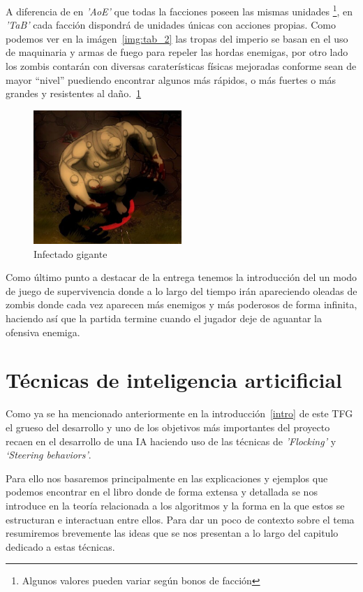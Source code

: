 A diferencia de en \textit{'\ac{AoE}'} que todas la facciones poseen las mismas unidades
\footnote{Algunos valores pueden variar según bonos de facción}, en
\textit{'\ac{TaB}'} cada facción dispondrá de unidades únicas con acciones propias.
Como podemos ver en la imágen~\ref{img:tab_2} las tropas del imperio se basan en el uso
de maquinaria y armas de fuego para repeler las hordas enemigas, por otro lado los
zombis contarán con diversas caraterísticas físicas mejoradas conforme sean de mayor
``nivel'' puediendo encontrar algunos más rápidos, o más fuertes o más grandes y
resistentes al daño.~\ref{img:tab_3}

\begin{figure}[ht]
\centering
\includegraphics[width=0.5\textwidth]{imagenes/marco_teo/referentes/tab_3.png}
\caption{Infectado gigante}
\label{img:tab_3}
\end{figure}

Como último punto a destacar de la entrega tenemos la introducción del un modo de
juego de supervivencia donde a lo largo del tiempo irán apareciendo oleadas de zombis
donde cada vez aparecen más enemigos y más poderosos de forma infinita, haciendo así
que la partida termine cuando el jugador deje de aguantar la ofensiva enemiga.


\section{Técnicas de inteligencia articificial}
Como ya se ha mencionado anteriormente en la introducción~\ref{intro} de este \ac{TFG}
el grueso del desarrollo y uno de los objetivos más importantes del proyecto recaen en
el desarrollo de una \ac{IA} haciendo uso de las técnicas de \textit{'Flocking'} y
\textit{`Steering behaviors'}.

Para ello nos basaremos principalmente en las explicaciones y ejemplos que podemos
encontrar en el libro \cite[ch.~3]{Millington2009} donde de forma extensa y detallada
se nos introduce en la teoría relacionada a los algoritmos y la forma en la que estos
se estructuran e interactuan entre ellos. Para dar un poco de contexto sobre el tema
resumiremos brevemente las ideas que se nos presentan a lo largo del capitulo dedicado
a estas técnicas. 

